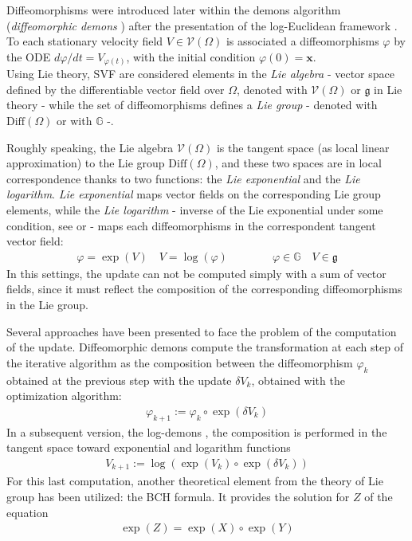 Diffeomorphisms were introduced later within the demons algorithm (\emph{diffeomorphic demons} \cite{vercauteren2006robust}) after the presentation of the log-Euclidean framework \cite{Arsigny:MRM:06}. 
To each stationary velocity field $V \in \mathcal{V}(\Omega)$ is associated a diffeomorphisms $\varphi$ by the ODE $d\varphi /dt = V_{\varphi(t)} $, with the initial condition $\varphi(0) = \mathbf{x}$.\\
Using Lie theory, SVF are considered elements in the \emph{Lie algebra} - vector space defined by the differentiable vector field over $\Omega$, denoted with $\mathcal{V}(\Omega)$ or $\mathfrak{g}$ in Lie theory - while the set of diffeomorphisms defines a \emph{Lie group} - denoted with $\text{Diff}(\Omega)$ or with $\mathbb{G}$ -.

Roughly speaking, the Lie algebra $\mathcal{V}(\Omega)$ is the tangent space (as local linear approximation) to the Lie group $\text{Diff}(\Omega)$, and these two spaces are in local correspondence thanks to two functions: the \emph{Lie exponential} and the \emph{Lie logarithm}. \emph{Lie exponential} maps vector fields on the corresponding Lie group elements, while the \emph{Lie logarithm} - inverse of the Lie exponential under some condition, see \cite{do1976differential} or \cite{lee2012introduction} - maps each diffeomorphisms in the correspondent tangent vector field:
\begin{align*}
\varphi = \exp(V)  
\quad
V = \log(\varphi ) 
\qquad \qquad
\varphi  \in \mathbb{G}
\quad
V \in \mathfrak{g}
\end{align*}
In this settings, the update can not be computed simply with a sum of vector fields, since it must reflect the composition of the corresponding diffeomorphisms in the Lie group.

Several approaches have been presented to face the problem of the computation of the update. Diffeomorphic demons compute the transformation at each step of the iterative algorithm as the composition between the diffeomorphism $\varphi_{k}$ obtained at the previous step with the update $\delta V_{k}$, obtained with the optimization algorithm:
\begin{align*}
\varphi_{k + 1} := \varphi_{k}  \circ \exp(\delta V_{k})
\end{align*}
In a subsequent version, the log-demons \cite{vercauteren08}, the composition is performed in the tangent space toward exponential and logarithm functions
\begin{align}\label{eq:bch_problem}
V_{k + 1} := \log( \exp(V_{k})  \circ \exp(\delta V_{k}))
\end{align}
For this last computation, another theoretical element from the theory of Lie group has been utilized: the BCH formula. It provides the solution for $Z$ of the equation 
\begin{align*}
 \exp(Z) = \exp(X)\circ\exp(Y)
\end{align*}

